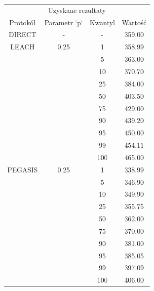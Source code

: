 \documentclass[a4paper,12pt,twoside,openany]{report}
\begin{document}
\begin{longtable}{*{4}{c}}
\toprule
\multicolumn{4}{c}{Uzyskane rezultaty} \\
Protokół	& Parametr `p`	& Kwantyl	& Wartość \\
\midrule
\endhead
DIRECT	& - 	& -	& 359.00 \\*
\midrule
LEACH	& 0.25	& 1	& 358.99 \\*
	&	& 5	& 363.00 \\*
	&	& 10	& 370.70 \\*
	&	& 25	& 384.00 \\*
	&	& 50	& 403.50 \\*
	&	& 75	& 429.00 \\*
	&	& 90	& 439.20 \\*
	&	& 95	& 450.00 \\*
	&	& 99	& 454.11 \\*
	&	& 100	& 465.00 \\*
\midrule
PEGASIS	& 0.25	& 1	& 338.99 \\*
	&	& 5	& 346.90 \\*
	&	& 10	& 349.90 \\*
	&	& 25	& 355.75 \\*
	&	& 50	& 362.00 \\*
	&	& 75	& 370.00 \\*
	&	& 90	& 381.00 \\*
	&	& 95	& 385.05 \\*
	&	& 99	& 397.09 \\*
	&	& 100	& 406.00 \\*
\bottomrule
\end{longtable}
\end{document}

